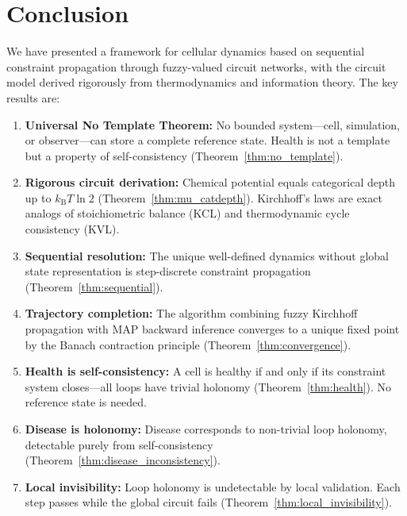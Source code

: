 \documentclass[10pt,twocolumn,a4paper]{article}
\theoremstyle{plain}
\theoremstyle{definition}
\theoremstyle{remark}
\newcommand{\kB}{k_{\mathrm{B}}}
\begin{document}
\section{Conclusion}
\label{sec:conclusion}

We have presented a framework for cellular dynamics based on sequential constraint propagation through fuzzy-valued circuit networks, with the circuit model derived rigorously from thermodynamics and information theory. The key results are:

\begin{enumerate}[label=(\arabic*)]
    \item \textbf{Universal No Template Theorem:} No bounded system---cell, simulation, or observer---can store a complete reference state. Health is not a template but a property of self-consistency (Theorem~\ref{thm:no_template}).

    \item \textbf{Rigorous circuit derivation:} Chemical potential equals categorical depth up to $\kB T \ln 2$ (Theorem~\ref{thm:mu_catdepth}). Kirchhoff's laws are exact analogs of stoichiometric balance (KCL) and thermodynamic cycle consistency (KVL).

    \item \textbf{Sequential resolution:} The unique well-defined dynamics without global state representation is step-discrete constraint propagation (Theorem~\ref{thm:sequential}).

    \item \textbf{Trajectory completion:} The algorithm combining fuzzy Kirchhoff propagation with MAP backward inference converges to a unique fixed point by the Banach contraction principle (Theorem~\ref{thm:convergence}).

    \item \textbf{Health is self-consistency:} A cell is healthy if and only if its constraint system closes---all loops have trivial holonomy (Theorem~\ref{thm:health}). No reference state is needed.

    \item \textbf{Disease is holonomy:} Disease corresponds to non-trivial loop holonomy, detectable purely from self-consistency (Theorem~\ref{thm:disease_inconsistency}).

    \item \textbf{Local invisibility:} Loop holonomy is undetectable by local validation. Each step passes while the global circuit fails (Theorem~\ref{thm:local_invisibility}).


\end{enumerate}
\end{document}
